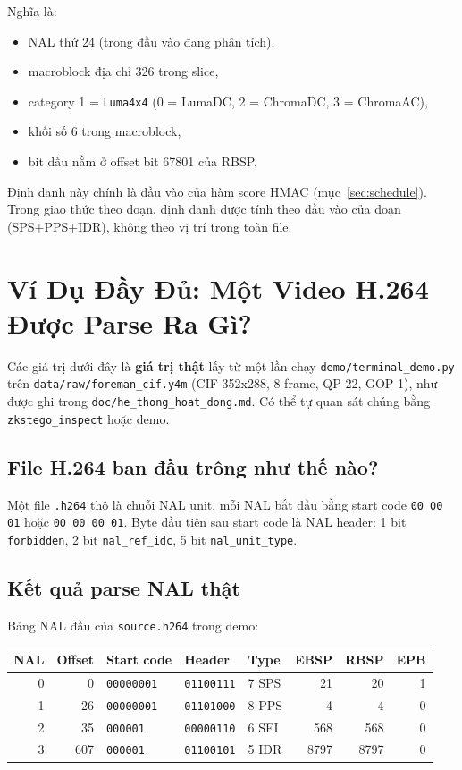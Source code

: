 \documentclass[11pt,a4paper]{article}
\begin{document}
Nghĩa là:

\begin{itemize}[leftmargin=*]
  \item NAL thứ 24 (trong đầu vào đang phân tích),
  \item macroblock địa chỉ 326 trong slice,
  \item category 1 = \texttt{Luma4x4} (0 = LumaDC, 2 = ChromaDC, 3 = ChromaAC),
  \item khối số 6 trong macroblock,
  \item bit dấu nằm ở offset bit 67801 của RBSP.
\end{itemize}

Định danh này chính là đầu vào của hàm score HMAC (mục~\ref{sec:schedule}). Trong
giao thức theo đoạn, định danh được tính theo đầu vào của đoạn (SPS+PPS+IDR),
không theo vị trí trong toàn file.

\section{Ví Dụ Đầy Đủ: Một Video H.264 Được Parse Ra Gì?}

Các giá trị dưới đây là \textbf{giá trị thật} lấy từ một lần chạy
\texttt{demo/terminal\_demo.py} trên \texttt{data/raw/foreman\_cif.y4m}
(CIF 352x288, 8 frame, QP 22, GOP 1), như được ghi trong
\texttt{doc/he\_thong\_hoat\_dong.md}. Có thể tự quan sát chúng bằng
\texttt{zkstego\_inspect} hoặc demo.

\subsection{File H.264 ban đầu trông như thế nào?}

Một file \texttt{.h264} thô là chuỗi NAL unit, mỗi NAL bắt đầu bằng start code
\texttt{00 00 01} hoặc \texttt{00 00 00 01}. Byte đầu tiên sau start code là NAL
header: 1 bit \texttt{forbidden}, 2 bit \texttt{nal\_ref\_idc}, 5 bit
\texttt{nal\_unit\_type}.

\subsection{Kết quả parse NAL thật}

Bảng NAL đầu của \texttt{source.h264} trong demo:

\begin{center}
\small
\begin{tabular}{rrlllrrr}
\toprule
NAL & Offset & Start code & Header & Type & EBSP & RBSP & EPB \\
\midrule
0 & 0 & \texttt{00000001} & \texttt{01100111} & 7 SPS & 21 & 20 & 1 \\
1 & 26 & \texttt{00000001} & \texttt{01101000} & 8 PPS & 4 & 4 & 0 \\
2 & 35 & \texttt{000001} & \texttt{00000110} & 6 SEI & 568 & 568 & 0 \\
3 & 607 & \texttt{000001} & \texttt{01100101} & 5 IDR & 8797 & 8797 & 0 \\
\bottomrule
\end{tabular}
\end{center}
\end{document}
